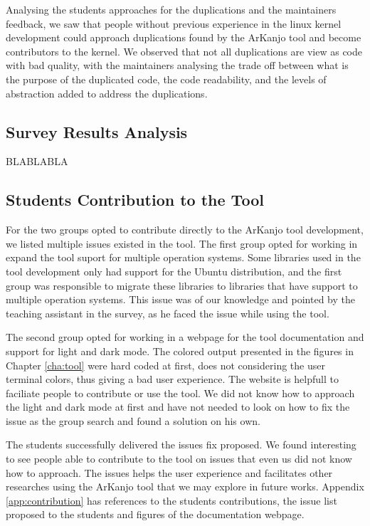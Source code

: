 Analysing the students approaches for the duplications and the maintainers feedback, 
we saw that people without previous experience in the linux kernel development could approach 
duplications found by the ArKanjo tool and become contributors to the kernel. We observed that 
not all duplications are view as code with bad quality, with the maintainers analysing the trade off
between what is the purpose of the duplicated code, the code readability, and the levels of abstraction 
added to address the duplications.

\subsection{Survey Results Analysis}

BLABLABLA

\subsection{Students Contribution to the Tool}

For the two groups opted to contribute directly to the ArKanjo tool development, 
we listed multiple issues existed in the tool. The first group opted for working 
in expand the tool suport for multiple operation systems. Some libraries used in the 
tool development only had support for the Ubuntu distribution, and the first group was 
responsible to migrate these libraries to libraries that have support to multiple operation
systems. This issue was of our knowledge and pointed by the teaching assistant in the survey, as 
he faced the issue while using the tool.

The second group opted for working in a webpage for the tool documentation and support 
for light and dark mode. The colored output presented in the figures in Chapter \ref{cha:tool} 
were hard coded at first, does not considering the user terminal colors, 
thus giving a bad user experience. The website is helpfull to 
faciliate people to contribute or use the tool. We did not know how to approach the light and 
dark mode at first and have not needed to look on how
to fix the issue as the group search and found a solution on his own. 

The students successfully delivered the issues fix proposed. We found interesting to see 
people able to contribute to the tool on issues that even us did not know how to approach.
The issues helps the user experience and facilitates other researches using the ArKanjo tool 
that we may explore in future works. Appendix \ref{app:contribution} has references to the
students contributions, the issue list proposed to the students and figures of the 
documentation webpage.
